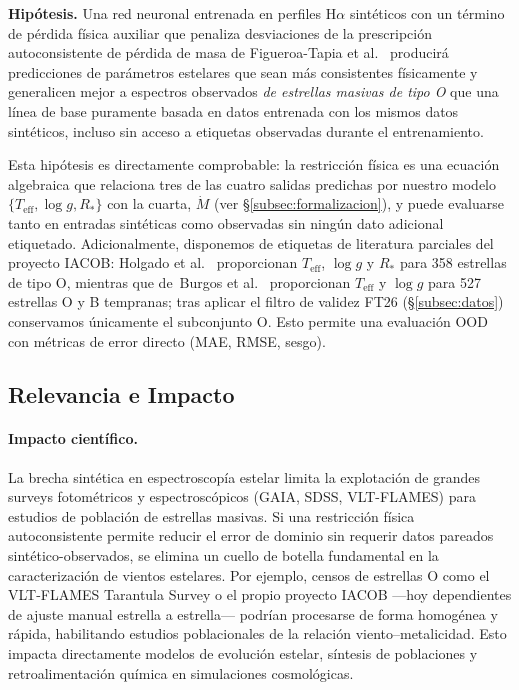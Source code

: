\documentclass[sigconf,ACM]{acmart}
\begin{document}
\textbf{Hipótesis.} Una red neuronal entrenada en perfiles H$\alpha$ sintéticos con un término de pérdida física auxiliar que penaliza desviaciones de la prescripción autoconsistente de pérdida de masa de Figueroa-Tapia et al.~\cite{FigueroaTapia2026} producirá predicciones de parámetros estelares que sean más consistentes físicamente y generalicen mejor a espectros observados \emph{de estrellas masivas de tipo O} que una línea de base puramente basada en datos entrenada con los mismos datos sintéticos, incluso sin acceso a etiquetas observadas durante el entrenamiento.

Esta hipótesis es directamente comprobable: la restricción física es una ecuación algebraica que relaciona tres de las cuatro salidas predichas por nuestro modelo $\{T_\mathrm{eff}, \log g, R_*\}$ con la cuarta, $\dot{M}$ (ver §\ref{subsec:formalizacion}), y puede evaluarse tanto en entradas sintéticas como observadas sin ningún dato adicional etiquetado. Adicionalmente, disponemos de etiquetas de literatura parciales del proyecto IACOB: Holgado et al.~\cite{Holgado2025} proporcionan $T_{\mathrm{eff}}$, $\log g$ y $R_*$ para 358 estrellas de tipo O, mientras que de~Burgos et al.~\cite{deBurgos2024} proporcionan $T_{\mathrm{eff}}$ y $\log g$ para 527 estrellas O y B tempranas; tras aplicar el filtro de validez FT26 (§\ref{subsec:datos}) conservamos únicamente el subconjunto O. Esto permite una evaluación OOD con métricas de error directo (MAE, RMSE, sesgo).
\subsection*{Relevancia e Impacto}

\paragraph{Impacto científico.} La brecha sintética en espectroscopía estelar limita la explotación de grandes surveys fotométricos y espectroscópicos (GAIA, SDSS, VLT-FLAMES) para estudios de población de estrellas masivas. Si una restricción física autoconsistente permite reducir el error de dominio sin requerir datos pareados sintético-observados, se elimina un cuello de botella fundamental en la caracterización de vientos estelares. Por ejemplo, censos de estrellas O como el VLT-FLAMES Tarantula Survey o el propio proyecto IACOB ---hoy dependientes de ajuste manual estrella a estrella--- podrían procesarse de forma homogénea y rápida, habilitando estudios poblacionales de la relación viento--metalicidad. Esto impacta directamente modelos de evolución estelar, síntesis de poblaciones y retroalimentación química en simulaciones cosmológicas.
\end{document}
